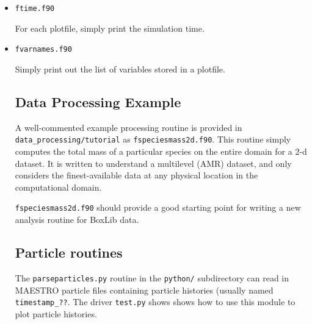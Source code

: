 \begin{itemize}
\item {\tt ftime.f90}
 
  For each plotfile, simply print the simulation time.


\item {\tt fvarnames.f90}

  Simply print out the list of variables stored in a plotfile.


\subsection{Data Processing Example}

A well-commented example processing routine is provided in {\tt
  data\_processing/tutorial} as {\tt fspeciesmass2d.f90}.  This
routine simply computes the total mass of a particular species on the
entire domain for a 2-d dataset.  It is written to understand a
multilevel (AMR) dataset, and only considers the finest-available data
at any physical location in the computational domain.  

{\tt fspeciesmass2d.f90} should provide a good starting point for
writing a new analysis routine for BoxLib data.

\subsection{Particle routines}

The {\tt parseparticles.py} routine in the {\tt python/} subdirectory
can read in MAESTRO particle files containing particle histories
(usually named {\tt timestamp\_??}.  The driver {\tt test.py} shows
shows how to use this module to plot particle histories.

\end{itemize}


